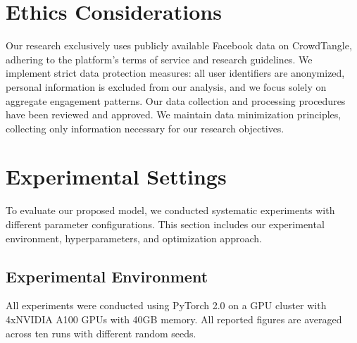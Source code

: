 \section{Ethics Considerations}
\label{sec:ethics}
Our research exclusively uses publicly available Facebook data on CrowdTangle, adhering to the platform's terms of service and research guidelines. We implement strict data protection measures: all user identifiers are anonymized, personal information is excluded from our analysis, and we focus solely on aggregate engagement patterns. Our data collection and processing procedures have been reviewed and approved. We maintain data minimization principles, collecting only information necessary for our research objectives.

\section{Experimental Settings}
\label{sec:exp_settings}
To evaluate our proposed \icmamba model, we conducted systematic experiments with different parameter configurations. This section includes our experimental environment, hyperparameters, and optimization approach.

\subsection{Experimental Environment}
\label{subsec:exp_env}
All experiments were conducted using PyTorch 2.0 on a GPU cluster with 4xNVIDIA A100 GPUs with 40GB memory.
All reported figures are averaged across ten runs with different random seeds.


